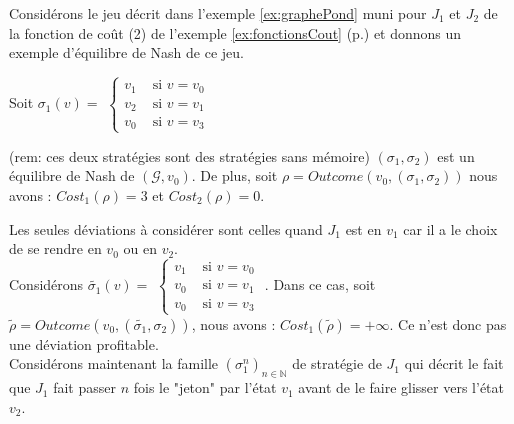
\begin{exemple}
	Considérons le jeu décrit dans l'exemple \ref{ex:graphePond} muni pour $J_{1}$ et $J_{2}$ de la fonction de coût (2) de l'exemple \ref{ex:fonctionsCout} (p.\pageref{ex:fonctionsCout}) et donnons un exemple d'équilibre de Nash de ce jeu.\\
	
	 \begin{minipage}[c]{0.30\linewidth}Soit $\sigma _{1}(v) =$ $\begin{cases}
						 v_{1} & \text{ si } v = v_{0}\\
						 v_{2} & \text{ si } v = v_{1}\\
						 v_{0} & \text{ si } v = v_{3}
						\end{cases}$ \end{minipage} \hfill
	\begin{minipage}[c]{0.30\linewidth}\end{minipage} \hfill \begin{minipage}[c]{0.30\linewidth}	 \end{minipage} \newline
		
\noindent	(rem: ces deux stratégies sont des stratégies sans mémoire) $(\sigma _{1}, \sigma _{2})$ est un équilibre de Nash de $(\mathcal{G}, v_{0})$. De plus, soit $\rho = Outcome(v_{0},(\sigma _{1},\sigma _{2}))$ nous avons : $Cost_{1}(\rho) = 3$ et $Cost_{2}(\rho) = 0$.\\
\begin{demonstration}	
	Les seules déviations à considérer sont celles quand $J_{1}$ est en $v_{1}$ car il a le choix de se rendre en $v_{0}$ ou en $v_{2}$.\\ Considérons $\tilde{\sigma _{1}}(v) = $ $\begin{cases}
						 v_{1} & \text{ si } v = v_{0}\\
						 v_{0} & \text{ si } v = v_{1}\\
						 v_{0} & \text{ si } v = v_{3}
						\end{cases}$ .
Dans ce cas, soit $\tilde{\rho} = Outcome(v_{0},(\tilde{\sigma _{1}},\sigma _{2}))$, nous avons : \mbox{$Cost_{1}(\tilde{\rho}) = + \infty$}. Ce n'est donc pas une déviation profitable.\\
Considérons maintenant la famille $(\sigma _{1}^{n})_{n \in \mathbb{N}}$ de stratégie de $J_{1}$ qui décrit le fait que $J_{1}$ fait passer $n$ fois le "jeton" par l'état $v_{1}$ avant de le faire glisser vers l'état $v_{2}$. \\


\end{demonstration}
\end{exemple}
